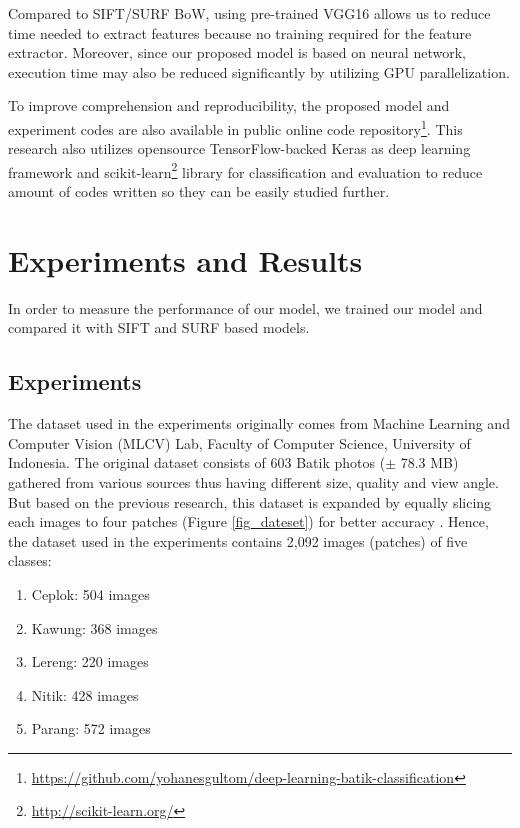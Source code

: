 \documentclass[conference, compsoc]{IEEEtran}
\begin{document}
Compared to SIFT/SURF BoW, using pre-trained VGG16 allows us to reduce time needed to extract features because no training required for the feature extractor. Moreover, since our proposed model is based on neural network, execution time may also be reduced significantly by utilizing GPU parallelization.

To improve comprehension and reproducibility, the proposed model and experiment codes are also available in public online code repository\footnote{\url{https://github.com/yohanesgultom/deep-learning-batik-classification}}. This research also utilizes opensource TensorFlow-backed Keras as deep learning framework and scikit-learn\footnote{\url{http://scikit-learn.org/}} library for classification and evaluation to reduce amount of codes written so they can be easily studied further.

\section{Experiments and Results}

In order to measure the performance of our model, we trained our model and compared it with SIFT and SURF based models.

\subsection{Experiments}

The dataset used in the experiments originally comes from Machine Learning and Computer Vision (MLCV) Lab, Faculty of Computer Science, University of Indonesia. The original dataset consists of 603 Batik photos ($\pm$ 78.3 MB) gathered from various sources thus having different size, quality and view angle. But based on the previous research, this dataset is expanded by equally slicing each images to four patches (Figure \ref{fig_dateset}) for better accuracy \cite{menzata2014sistem}. Hence, the dataset used in the experiments contains 2,092 images (patches) of five classes:

\begin{enumerate}
\item Ceplok: 504 images
\item Kawung: 368 images
\item Lereng: 220 images
\item Nitik: 428 images
\item Parang: 572 images
\end{enumerate}
\end{document}
